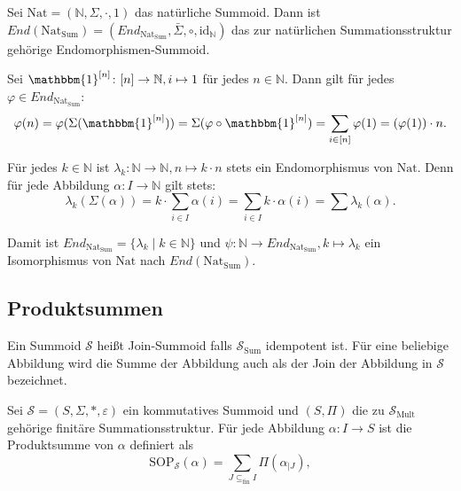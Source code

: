 \documentclass{article}
\begin{document}
\begin{example}
  Sei $\text{Nat} = (\mathbb{N}, \Sigma, \cdot, 1)$ das natürliche Summoid.
  Dann ist \\$End(\text{Nat}_\text{Sum}) = (End_{\text{Nat}_\text{Sum}}, \bar\Sigma, \circ, \text{id}_\mathbb{N})$ das zur natürlichen Summationsstruktur gehörige Endomorphismen-Summoid.

  Sei $\mathbbm{1}^{[n]} \colon [n] \to \mathbb{N}, i \mapsto 1$ für jedes $n \in \mathbb{N}$.
  Dann gilt für jedes $\varphi \in End_{\text{Nat}_\text{Sum}}$:
  \begin{equation*}
    \varphi(n) = \varphi(\Sigma(\mathbbm{1}^{[n]})) = \Sigma(\varphi \circ \mathbbm{1}^{[n]}) = \sum_{i \in [n]}\varphi(1) = (\varphi(1)) \cdot n.
  \end{equation*}

  Für jedes $k \in \mathbb{N}$ ist $\lambda_k \colon \mathbb{N} \to \mathbb{N}, n \mapsto k \cdot n$
  stets ein Endomorphismus von $\text{Nat}$.
  Denn für jede Abbildung $\alpha \colon I \to \mathbb{N}$ gilt stets:
  \begin{equation*}
    \lambda_k(\Sigma(\alpha)) = k \cdot \sum_{i \in I}\alpha(i) = \sum_{i \in I}k \cdot \alpha(i) = \sum \lambda_k(\alpha).
  \end{equation*}

  Damit ist $End_{\text{Nat}_\text{Sum}} = \{\lambda_k \mid k \in \mathbb{N}\}$
  und $\psi \colon \mathbb{N} \to End_{\text{Nat}_\text{Sum}}, k \mapsto \lambda_k$
  ein Isomorphismus von $\text{Nat}$ nach $End(\text{Nat}_\text{Sum})$.
\end{example}

\subsection{Produktsummen}

\begin{definition}
  Ein Summoid $\mathcal{S}$ heißt Join-Summoid falls $\mathcal{S}_\text{Sum}$ idempotent ist.
  Für eine beliebige Abbildung wird die Summe der Abbildung auch als der Join der Abbildung in $\mathcal{S}$ bezeichnet.
\end{definition}

\begin{definition}
  Sei $\mathcal{S} = (S, \Sigma, \ast, \varepsilon)$ ein kommutatives Summoid 
  und $(S, \Pi)$ die zu $\mathcal{S}_\text{Mult}$ gehörige finitäre Summationsstruktur.
  Für jede Abbildung $\alpha \colon I \to S$ ist die Produktsumme von $\alpha$ definiert als
  \begin{equation*}
    \text{SOP}_\mathcal{S}(\alpha) = \sum_{J \subseteq_\text{fin} I}\Pi(\alpha_{\mid J}),
  \end{equation*}
\end{definition}
\end{document}
